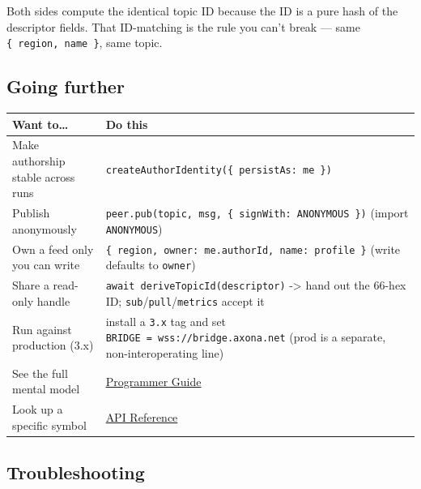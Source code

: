 \documentclass[
  nobib]{tufte-handout}
\newcounter{none} %
\begin{document}
Both sides compute the identical topic ID because the ID is a pure hash
of the descriptor fields. That ID-matching is the rule you can't break
--- same \texttt{\{\ region,\ name\ \}}, same topic.

\subsection{Going further}\label{going-further}

{\def\LTcaptype{none} %
\begin{longtable}[]{@{}
  >{\raggedright\arraybackslash}p{}
  >{\raggedright\arraybackslash}p{}@{}}
\toprule\noalign{}
\begin{minipage}[b]{\linewidth}\raggedright
Want to\ldots{}
\end{minipage} & \begin{minipage}[b]{\linewidth}\raggedright
Do this
\end{minipage} \\
\midrule\noalign{}
\endhead
\bottomrule\noalign{}
\endlastfoot
Make authorship stable across runs &
\texttt{createAuthorIdentity(\{\ persistAs:\ \textquotesingle{}me\textquotesingle{}\ \})} \\
Publish anonymously &
\texttt{peer.pub(topic,\ msg,\ \{\ signWith:\ ANONYMOUS\ \})} (import
\texttt{ANONYMOUS}) \\
Own a feed only you can write &
\texttt{\{\ region,\ owner:\ me.authorId,\ name:\ \textquotesingle{}profile\textquotesingle{}\ \}}
(write defaults to
\texttt{\textquotesingle{}owner\textquotesingle{}}) \\
Share a read-only handle & \texttt{await\ deriveTopicId(descriptor)}
-\textgreater{} hand out the 66-hex ID;
\texttt{sub}/\texttt{pull}/\texttt{metrics} accept it \\
Run against production (3.x) & install a \texttt{3.x} tag and set
\texttt{BRIDGE\ =\ \textquotesingle{}wss://bridge.axona.net\textquotesingle{}}
(prod is a separate, non-interoperating line) \\
See the full mental model &
\href{Axona-Programmer-Guide-v4.11.2.md}{Programmer Guide} \\
Look up a specific symbol & \href{Axona-API-Reference-v4.11.2.md}{API
Reference} \\
\end{longtable}
}

\subsection{Troubleshooting}\label{troubleshooting}
\end{document}
